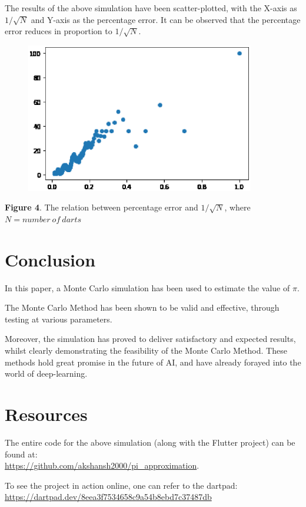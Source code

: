 \documentclass{resonance}
\begin{document}
	The results of the above simulation have been scatter-plotted, with the X-axis as $1/\sqrt{N}$ and Y-axis as the percentage error. It can be observed that the percentage error reduces in proportion to $1/\sqrt{N}$.
	
	\begin{figure}[H]
		\includegraphics[width=10cm]{error-plot}
	\end{figure}
	\vspace{-10pt}\hspace{10pt}\scriptsize{\textbf{Figure 4}. The relation between percentage error and $1/\sqrt{N}$, where $N = number\ of\ darts$}

	\normalsize
	\section{Conclusion}
	In this paper, a Monte Carlo simulation has been used to estimate the value of $\pi$.
	
	The Monte Carlo Method has been shown to be valid and effective, through testing at various parameters.
	
	Moreover, the simulation has proved to deliver satisfactory and expected results, whilst clearly demonstrating the feasibility of the Monte Carlo Method. These methods hold great promise in the future of AI, and have already forayed into the world of deep-learning.
	
	\section{Resources}
	The entire code for the above simulation (along with the Flutter project) can be found at:\\ \textcolor{blue}{\url{https://github.com/akshansh2000/pi_approximation}}.
	
	To see the project in action online, one can refer to the dartpad:\\
	\textcolor{blue}{\url{https://dartpad.dev/8eea3f7534658c9a54b8ebd7c37487db}}
	
\end{document}
